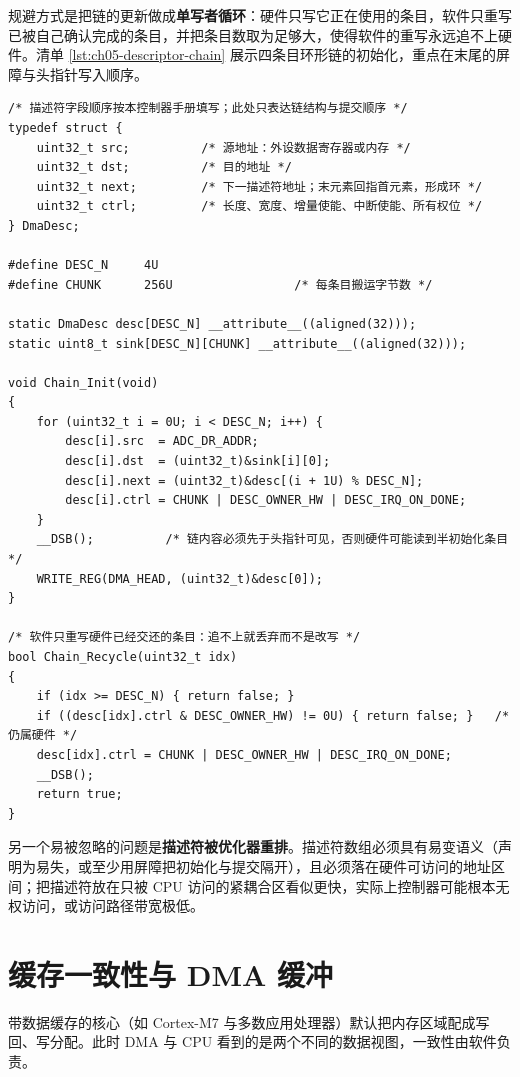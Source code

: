 \documentclass[12pt,a4paper,fontset=fandol]{ctexbook}
\begin{document}
规避方式是把链的更新做成\textbf{单写者循环}：硬件只写它正在使用的条目，软件只重写已被自己确认完成的条目，并把条目数取为足够大，使得软件的重写永远追不上硬件。清单 \ref{lst:ch05-descriptor-chain} 展示四条目环形链的初始化，重点在末尾的屏障与头指针写入顺序。

\begin{lstlisting}[style=cstyle,caption={C：四描述符环形链的构造与提交},label={lst:ch05-descriptor-chain}]
/* 描述符字段顺序按本控制器手册填写；此处只表达链结构与提交顺序 */
typedef struct {
    uint32_t src;          /* 源地址：外设数据寄存器或内存 */
    uint32_t dst;          /* 目的地址 */
    uint32_t next;         /* 下一描述符地址；末元素回指首元素，形成环 */
    uint32_t ctrl;         /* 长度、宽度、增量使能、中断使能、所有权位 */
} DmaDesc;

#define DESC_N     4U
#define CHUNK      256U                 /* 每条目搬运字节数 */

static DmaDesc desc[DESC_N] __attribute__((aligned(32)));
static uint8_t sink[DESC_N][CHUNK] __attribute__((aligned(32)));

void Chain_Init(void)
{
    for (uint32_t i = 0U; i < DESC_N; i++) {
        desc[i].src  = ADC_DR_ADDR;
        desc[i].dst  = (uint32_t)&sink[i][0];
        desc[i].next = (uint32_t)&desc[(i + 1U) % DESC_N];
        desc[i].ctrl = CHUNK | DESC_OWNER_HW | DESC_IRQ_ON_DONE;
    }
    __DSB();          /* 链内容必须先于头指针可见，否则硬件可能读到半初始化条目 */
    WRITE_REG(DMA_HEAD, (uint32_t)&desc[0]);
}

/* 软件只重写硬件已经交还的条目：追不上就丢弃而不是改写 */
bool Chain_Recycle(uint32_t idx)
{
    if (idx >= DESC_N) { return false; }
    if ((desc[idx].ctrl & DESC_OWNER_HW) != 0U) { return false; }   /* 仍属硬件 */
    desc[idx].ctrl = CHUNK | DESC_OWNER_HW | DESC_IRQ_ON_DONE;
    __DSB();
    return true;
}
\end{lstlisting}

另一个易被忽略的问题是\textbf{描述符被优化器重排}。描述符数组必须具有易变语义（声明为易失，或至少用屏障把初始化与提交隔开），且必须落在硬件可访问的地址区间；把描述符放在只被 CPU 访问的紧耦合区看似更快，实际上控制器可能根本无权访问，或访问路径带宽极低。

\section{缓存一致性与 DMA 缓冲}

带数据缓存的核心（如 Cortex-M7 与多数应用处理器）默认把内存区域配成写回、写分配。此时 DMA 与 CPU 看到的是两个不同的数据视图，一致性由软件负责。
\end{document}
